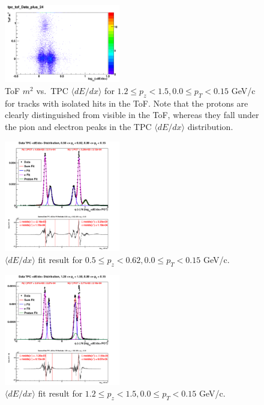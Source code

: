 \documentclass[%
aps, prd, reprint, show pacs, preprint numbers, ams math, amssymb, superscriptaddress, linenumbers]{revtex4-1}
\newcommand{\dedx}{\ensuremath{\langle dE/dx\rangle}\xspace}
\begin{document}
\begin{figure}[!ht] %
   \centering
   \includegraphics[width=0.45\textwidth]{tpc_tof_Data_plus_24_zoom} 
   \caption{ToF $m^2$ vs.~TPC \dedx for $1.2 \le p_z < 1.5, 0.0 \le p_T < 0.15$ GeV/c for tracks with isolated hits in the ToF.  Note that the protons are clearly distinguished from visible in the ToF, whereas they fall under the pion and electron peaks in the TPC \dedx distribution.}
   \label{fig:ToFvsTPC}
\end{figure}

\begin{figure}[!ht] %
   \centering
   \includegraphics[width=0.45\textwidth]{fitdedx_data_4} 
   \caption{\dedx fit result for $0.5 \le p_z < 0.62, 0.0 \le p_T < 0.15$ GeV/c.}
   \label{fig:fitdedx4}
\end{figure}

\begin{figure}[!ht] %
   \centering
   \includegraphics[width=0.45\textwidth]{fitdedx_data_24} 
   \caption{\dedx fit result for $1.2 \le p_z < 1.5, 0.0 \le p_T < 0.15$ GeV/c.}
   \label{fig:fitdedx24}
\end{figure}
\end{document}
